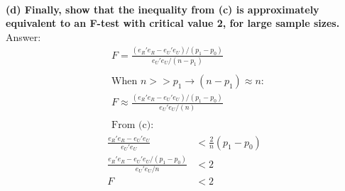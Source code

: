 \documentclass[12pt, a4paper]{article}
\begin{document}
\vspace{20em}\\
\textbf{(d) Finally, show that the inequality from (c) is approximately equivalent to an F-test with critical value 2, for large sample sizes.}\\
Answer:
\begin{align*}
    &F = \frac{(e_R'e_R - e_U'e_U)/(p_1-p_0)}{e_U'e_U/(n-p_1)}\\\\
    &\text{When } n >> p_1 \rightarrow (n-p_1) \approx n:\\
    &F \approx \frac{(e_R'e_R - e_U'e_U)/(p_1-p_0)}{e_U'e_U/(n)}\\\\
    &\text{From (c):}
\end{align*}
\begin{align*}
    \frac{e_R'e_R - e_U'e_U}{e_U'e_U} &<\frac{2}{n}(p_1 - p_0)\\
    \frac{e_R'e_R - e_U'e_U/(p_1 - p_0)}{e_U'e_U/n} &<2\\
    F &<2\\
\end{align*}
\vspace{1em}
\end{document}
